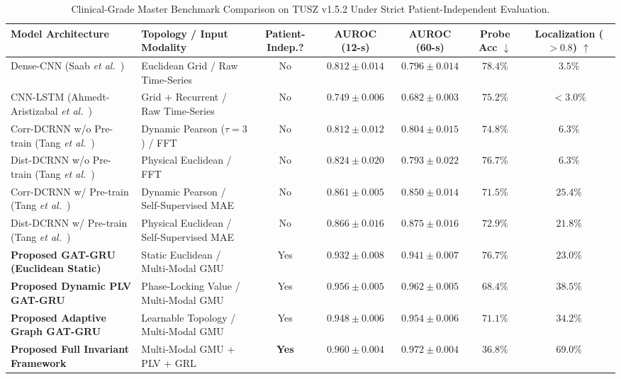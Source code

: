 \documentclass[journal]{IEEEtran}
\begin{document}
\begin{table}[t]
\caption{Clinical-Grade Master Benchmark Comparison on TUSZ v1.5.2 Under Strict Patient-Independent Evaluation.}
\label{tab:master_benchmark}
\centering
\small
\begin{tabular}{llccccc}
\toprule
\textbf{Model Architecture} & \textbf{Topology / Input Modality} & \textbf{Patient-Indep.?} & \textbf{AUROC (12-s)} & \textbf{AUROC (60-s)} & \textbf{Probe Acc $\downarrow$} & \textbf{Localization ($>0.8$) $\uparrow$} \\
\midrule
Dense-CNN (Saab \textit{et al.}~\cite{saab2020weak}) & Euclidean Grid / Raw Time-Series & No & $0.812 \pm 0.014$ & $0.796 \pm 0.014$ & $78.4\%$ & $3.5\%$ \\
CNN-LSTM (Ahmedt-Aristizabal \textit{et al.}~\cite{ahmedt2020deep}) & Grid + Recurrent / Raw Time-Series & No & $0.749 \pm 0.006$ & $0.682 \pm 0.003$ & $75.2\%$ & $<3.0\%$ \\
Corr-DCRNN w/o Pre-train (Tang \textit{et al.}~\cite{tang2022self}) & Dynamic Pearson ($\tau=3$) / FFT & No & $0.812 \pm 0.012$ & $0.804 \pm 0.015$ & $74.8\%$ & $6.3\%$ \\
Dist-DCRNN w/o Pre-train (Tang \textit{et al.}~\cite{tang2022self}) & Physical Euclidean / FFT & No & $0.824 \pm 0.020$ & $0.793 \pm 0.022$ & $76.7\%$ & $6.3\%$ \\
Corr-DCRNN w/ Pre-train (Tang \textit{et al.}~\cite{tang2022self}) & Dynamic Pearson / Self-Supervised MAE & No & $0.861 \pm 0.005$ & $0.850 \pm 0.014$ & $71.5\%$ & $25.4\%$ \\
Dist-DCRNN w/ Pre-train (Tang \textit{et al.}~\cite{tang2022self}) & Physical Euclidean / Self-Supervised MAE & No & $0.866 \pm 0.016$ & $0.875 \pm 0.016$ & $72.9\%$ & $21.8\%$ \\
\midrule
\textbf{Proposed GAT-GRU (Euclidean Static)} & Static Euclidean / Multi-Modal GMU & Yes & $0.932 \pm 0.008$ & $0.941 \pm 0.007$ & $76.7\%$ & $23.0\%$ \\
\textbf{Proposed Dynamic PLV GAT-GRU} & Phase-Locking Value / Multi-Modal GMU & Yes & $0.956 \pm 0.005$ & $0.962 \pm 0.005$ & $68.4\%$ & $38.5\%$ \\
\textbf{Proposed Adaptive Graph GAT-GRU} & Learnable Topology / Multi-Modal GMU & Yes & $0.948 \pm 0.006$ & $0.954 \pm 0.006$ & $71.1\%$ & $34.2\%$ \\
\textbf{Proposed Full Invariant Framework} & Multi-Modal GMU + PLV + GRL & \textbf{Yes} & $\mathbf{0.960 \pm 0.004}$ & $\mathbf{0.972 \pm 0.004}$ & $\mathbf{36.8\%}$ & $\mathbf{69.0\%}$ \\
\bottomrule
\end{tabular}
\end{table}
\end{document}
